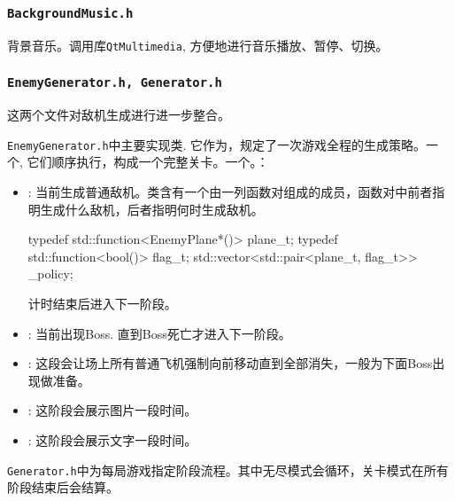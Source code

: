 \documentclass[UTF8,12pt]{ctexart}
\begin{document}
	        \subsubsection{\tt BackgroundMusic.h}
	            背景音乐。调用库\texttt{QtMultimedia}, 方便地进行音乐播放、暂停、切换。

	        \subsubsection{\tt EnemyGenerator.h, Generator.h}
	            这两个文件对敌机生成进行进一步整合。

	            \texttt{EnemyGenerator.h}中主要实现类\cppinline@EnemyGenerator@. 它作为，规定了一次游戏全程的生成策略。一个\cppinline@Policy@, 它们顺序执行，构成一个完整关卡。一个。：
	            \begin{itemize}[nosep]
	                \item \cppinline@EnemyGeneratingPolicy@: 当前生成普通敌机。类含有一个由一列函数对组成的成员，函数对中前者指明生成什么敌机，后者指明何时生成敌机。
	                    \begin{cppcode}
                            typedef std::function<EnemyPlane*()> plane_t;
                            typedef std::function<bool()> flag_t;
                            std::vector<std::pair<plane_t, flag_t>> _policy;
                        \end{cppcode}
	                    计时结束后进入下一阶段。
	                \item \cppinline@BossGeneratingPolicy@: 当前出现Boss. 直到Boss死亡才进入下一阶段。
	                \item \cppinline@EnemyClearingPolicy@: 这段会让场上所有普通飞机强制向前移动直到全部消失，一般为下面Boss出现做准备。
	                \item \cppinline@PictureDisplay@: 这阶段会展示图片一段时间。
	                \item \cppinline@MessageDisplay@: 这阶段会展示文字一段时间。
	            \end{itemize}
	            \vspace*{0.5\baselineskip}\par
	            \texttt{Generator.h}中为每局游戏指定阶段流程。其中无尽模式会循环，关卡模式在所有阶段结束后会结算。
\end{document}

